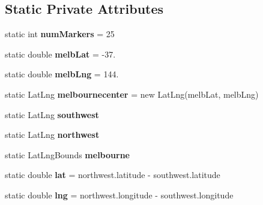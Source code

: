 \subsection*{Static Private Attributes}
\begin{DoxyCompactItemize}
\item 
\hypertarget{classcom_1_1qualoutdoor_1_1recorder_1_1map_1_1DataMapFragment_abf9b8e361549571285cf999f7eadf28c}{static int {\bfseries num\-Markers} = 25}\label{classcom_1_1qualoutdoor_1_1recorder_1_1map_1_1DataMapFragment_abf9b8e361549571285cf999f7eadf28c}

\item 
\hypertarget{classcom_1_1qualoutdoor_1_1recorder_1_1map_1_1DataMapFragment_a694479dfe8c0bb25d948eba8b8ef82d3}{static double {\bfseries melb\-Lat} = -\/37.}\label{classcom_1_1qualoutdoor_1_1recorder_1_1map_1_1DataMapFragment_a694479dfe8c0bb25d948eba8b8ef82d3}

\item 
\hypertarget{classcom_1_1qualoutdoor_1_1recorder_1_1map_1_1DataMapFragment_afc47dba18d6c9b4b1cf8cf06a6b340ea}{static double {\bfseries melb\-Lng} = 144.}\label{classcom_1_1qualoutdoor_1_1recorder_1_1map_1_1DataMapFragment_afc47dba18d6c9b4b1cf8cf06a6b340ea}

\item 
\hypertarget{classcom_1_1qualoutdoor_1_1recorder_1_1map_1_1DataMapFragment_a91e704a9e643164746f185e7b0d7cd20}{static Lat\-Lng {\bfseries melbournecenter} = new Lat\-Lng(melb\-Lat, melb\-Lng)}\label{classcom_1_1qualoutdoor_1_1recorder_1_1map_1_1DataMapFragment_a91e704a9e643164746f185e7b0d7cd20}

\item 
static Lat\-Lng {\bfseries southwest}
\item 
static Lat\-Lng {\bfseries northwest}
\item 
static Lat\-Lng\-Bounds {\bfseries melbourne}
\item 
\hypertarget{classcom_1_1qualoutdoor_1_1recorder_1_1map_1_1DataMapFragment_ae59f29056fb6c2660a0df13dd97f7104}{static double {\bfseries lat} = northwest.\-latitude -\/ southwest.\-latitude}\label{classcom_1_1qualoutdoor_1_1recorder_1_1map_1_1DataMapFragment_ae59f29056fb6c2660a0df13dd97f7104}

\item 
\hypertarget{classcom_1_1qualoutdoor_1_1recorder_1_1map_1_1DataMapFragment_a95712fa0c706d3d5b319708fe9f09e95}{static double {\bfseries lng} = northwest.\-longitude -\/ southwest.\-longitude}\label{classcom_1_1qualoutdoor_1_1recorder_1_1map_1_1DataMapFragment_a95712fa0c706d3d5b319708fe9f09e95}

\end{DoxyCompactItemize}


